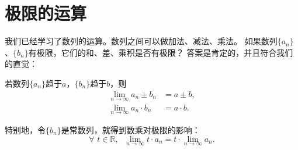 \documentclass[12pt,UTF8,fontset=none]{ctexbook}
\begin{document}
\section{极限的运算}
我们已经学习了数列的运算。数列之间可以做加法、减法、乘法。
如果数列$\{a_n\}$、$\{b_n\}$有极限，它们的和、差、乘积是否有极限？
答案是肯定的，并且符合我们的直觉：
\begin{tm}
    若数列$\{a_n\}$趋于$a$，$\{b_n\}$趋于$b$，则
    \begin{align*}
        \lim_{n\to\infty} a_n \pm b_n &= a \pm b,  \\
        \lim_{n\to\infty} a_n \cdot b_n &= a \cdot b.  
    \end{align*}
\end{tm}
特别地，令$\{b_n\}$是常数列，就得到数乘对极限的影响：
$$ \forall \,\, t \in \mathbb{R}, \;\,\,  \lim_{n\to\infty} t \cdot a_n = t \cdot \lim_{n\to\infty} a_n. $$
\end{document}
